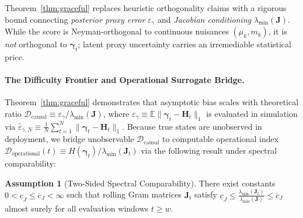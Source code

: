 \documentclass[twoside]{article}
\theoremstyle{definition}
\newtheorem{assumption}{Assumption}
\newcommand{\E}{\mathbb{E}}
\begin{document}
Theorem~\ref{thm:graceful} replaces heuristic orthogonality claims with a rigorous bound connecting \emph{posterior proxy error} $\varepsilon_\gamma$ and \emph{Jacobian conditioning} $\lambda_{\min}(\boldsymbol{J})$. While the score is Neyman-orthogonal to continuous nuisances $(\mu_k, m_k)$, it is \emph{not} orthogonal to $\boldsymbol{\gamma}_t$; latent proxy uncertainty carries an irremediable statistical price.

\paragraph{The Difficulty Frontier and Operational Surrogate Bridge.}
Theorem~\ref{thm:graceful} demonstrates that asymptotic bias scales with theoretical ratio $\mathcal{D}_{\mathrm{causal}} \equiv \varepsilon_\gamma / \lambda_{\min}(\boldsymbol{J})$, where $\varepsilon_\gamma \equiv \E\|\boldsymbol{\gamma}_t - \boldsymbol{H}_t\|_1$ is evaluated in simulation via $\hat{\varepsilon}_{\gamma, N} \equiv \frac{1}{N}\sum_{t=1}^N \|\boldsymbol{\gamma}_t - \boldsymbol{H}_t\|_1$. Because true states are unobserved in deployment, we bridge unobservable $\mathcal{D}_{\mathrm{causal}}$ to computable operational index $\mathcal{D}_{\mathrm{operational}}(t) \equiv H(\boldsymbol{\gamma}_t) / \lambda_{\min}(\boldsymbol{J}_t)$ via the following result under spectral comparability:
\begin{assumption}[Two-Sided Spectral Comparability]
\label{ass:spectral_comparability}
There exist constants $0 < \underline{c}_J \le \overline{c}_J < \infty$ such that rolling Gram matrices $\boldsymbol{J}_t$ satisfy $\underline{c}_J \le \frac{\lambda_{\min}(\boldsymbol{J}_t)}{\lambda_{\min}(\boldsymbol{J})} \le \overline{c}_J$ almost surely for all evaluation windows $t \ge w$.
\end{assumption}
\end{document}
